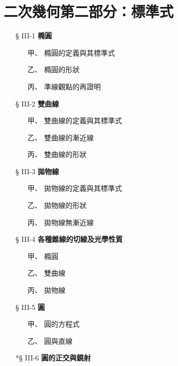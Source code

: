 
\section{二次幾何\texorpdfstring{\quad }{ }第二部分：標準式}
\label{sec:b4s-ch3}

\begin{center}
\begin{minipage}{0.75\textwidth}
\begin{itemize}[leftmargin=2em, itemsep=0.3em]
  \item[§ III-1] \textbf{橢圓}
  \begin{itemize}[leftmargin=2em, itemsep=0.2em]
    \item[甲、] 橢圓的定義與其標準式
    \item[乙、] 橢圓的形狀
    \item[丙、] 準線觀點的再證明
  \end{itemize}
  \item[§ III-2] \textbf{雙曲線}
  \begin{itemize}[leftmargin=2em, itemsep=0.2em]
    \item[甲、] 雙曲線的定義與其標準式
    \item[乙、] 雙曲線的漸近線
    \item[丙、] 雙曲線的形狀
  \end{itemize}
  \item[§ III-3] \textbf{拋物線}
  \begin{itemize}[leftmargin=2em, itemsep=0.2em]
    \item[甲、] 拋物線的定義與其標準式
    \item[乙、] 拋物線的形狀
    \item[丙、] 拋物線無漸近線
  \end{itemize}
  \item[§ III-4] \textbf{各種錐線的切線及光學性質}
  \begin{itemize}[leftmargin=2em, itemsep=0.2em]
    \item[甲、] 橢圓
    \item[乙、] 雙曲線
    \item[丙、] 拋物線
  \end{itemize}
  \item[§ III-5] \textbf{圓}
  \begin{itemize}[leftmargin=2em, itemsep=0.2em]
    \item[甲、] 圓的方程式
    \item[乙、] 圓與直線
  \end{itemize}
  \item[*§ III-6] \textbf{圓的正交與鏡射}
\end{itemize}
\end{minipage}
\end{center}

